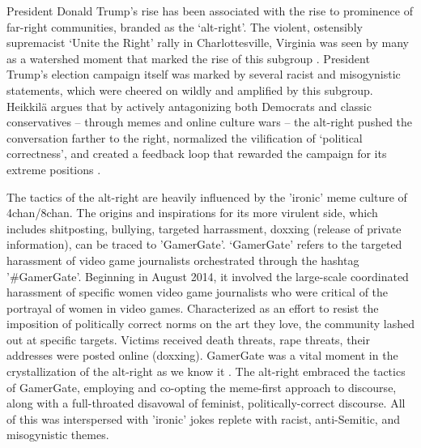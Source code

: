 President Donald Trump’s rise has been associated with the rise to prominence of far-right communities, branded as the ‘alt-right’. The violent, ostensibly supremacist ‘Unite the Right’ rally in Charlottesville, Virginia was seen by many as a watershed moment that marked the rise of this subgroup \citep{atkinson_charlottesville_2018}. President Trump’s election campaign itself was marked by several racist and misogynistic statements, which were cheered on wildly and amplified by this subgroup. Heikkilä argues that by actively antagonizing both Democrats and classic conservatives -- through memes and online culture wars -- the alt-right pushed the conversation farther to the right, normalized the vilification of ‘political correctness’, and created a feedback loop that rewarded the campaign for its extreme positions \citep{heikkila_online_2017, nagle_kill_2017}. 

The tactics of the alt-right are heavily influenced by the 'ironic' meme culture of 4chan/8chan. The origins and inspirations for its more virulent side, which includes shitposting, bullying, targeted harrassment, doxxing (release of private information), can be traced to 'GamerGate'. ‘GamerGate’ refers to the targeted harassment of video game journalists  orchestrated through the hashtag '\#GamerGate'. Beginning in August 2014, it involved the large-scale coordinated harassment of specific women video game journalists who were critical of the portrayal of women in video games. Characterized as an effort to resist the imposition of politically correct norms on the art they love, the community lashed out at specific targets. Victims received death threats, rape threats, their addresses were posted online (doxxing). GamerGate was a vital moment in the crystallization of the alt-right as we know it \citep{blodgett_ghostbusters_2018}. The alt-right embraced the tactics of GamerGate, employing and co-opting the meme-first approach to discourse, along with a full-throated disavowal of feminist, politically-correct discourse. All of this was interspersed with 'ironic' jokes replete with racist, anti-Semitic, and misogynistic themes.

